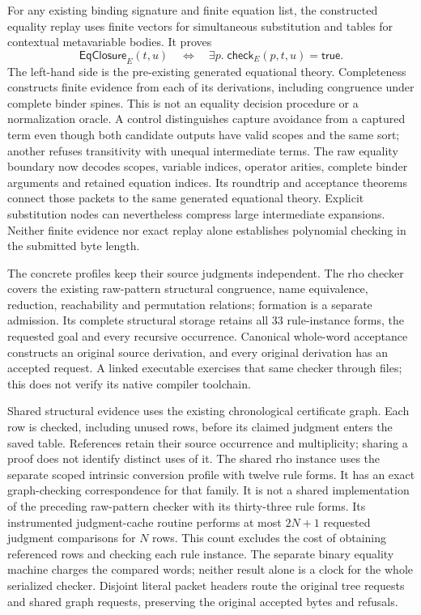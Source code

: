 \documentclass[11pt]{article}
\newcommand{\proofCheck}{\mathsf{check}}
\begin{document}
For any existing binding signature and finite equation list, the constructed
equality replay uses finite vectors for simultaneous substitution and tables
for contextual metavariable bodies. It proves
\[
  \mathsf{EqClosure}_E(t,u)
  \quad\Longleftrightarrow\quad
  \exists p.\;\proofCheck_E(p,t,u)=\mathsf{true}.
\]
The left-hand side is the pre-existing generated equational theory. Completeness
constructs finite evidence from each of its derivations, including congruence
under complete binder spines. This is not an equality decision procedure or a
normalization oracle. A control distinguishes capture avoidance from a captured
term even though both candidate outputs have valid scopes and the same sort;
another refuses transitivity with unequal intermediate terms.
The raw equality boundary now decodes scopes, variable indices, operator
arities, complete binder arguments and retained equation indices. Its
roundtrip and acceptance theorems connect those packets to the same generated
equational theory. Explicit substitution nodes can nevertheless compress
large intermediate expansions. Neither finite evidence nor exact replay alone
establishes polynomial checking in the submitted byte length.

The concrete profiles keep their source judgments independent. The rho checker
covers the existing raw-pattern structural congruence, name equivalence,
reduction, reachability and permutation relations; formation is a separate
admission. Its complete structural storage retains all 33 rule-instance forms,
the requested goal and every recursive occurrence. Canonical whole-word
acceptance constructs an original source derivation, and every original
derivation has an accepted request. A linked executable exercises that same
checker through files; this does not verify its native compiler toolchain.

Shared structural evidence uses the existing chronological certificate graph.
Each row is checked, including unused rows, before its claimed judgment enters
the saved table. References retain their source occurrence and multiplicity;
sharing a proof does not identify distinct uses of it. The shared rho
instance uses the separate scoped intrinsic conversion profile with twelve
rule forms. It has an exact graph-checking correspondence for that family.
It is not a shared implementation of the preceding raw-pattern checker
with its thirty-three rule forms. Its instrumented judgment-cache routine performs
at most $2N+1$ requested judgment comparisons for $N$ rows. This count excludes
the cost of obtaining referenced rows and checking each rule instance. The
separate binary equality machine charges the compared words; neither result
alone is a clock for the whole serialized checker. Disjoint literal packet
headers route the original tree requests and shared graph requests, preserving
the original accepted bytes and refusals.
\end{document}
